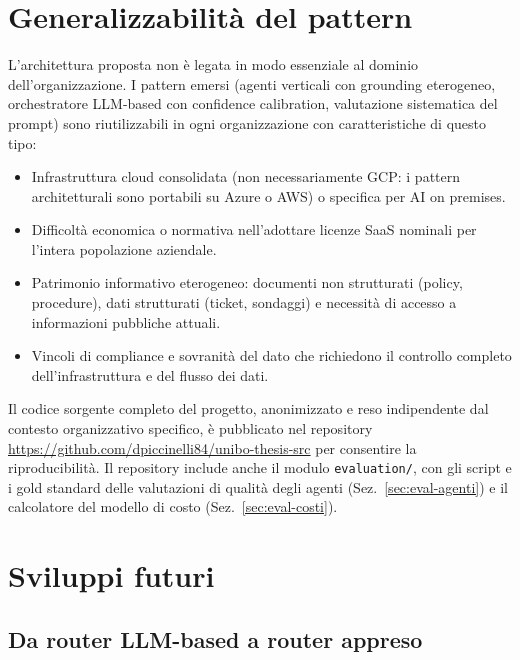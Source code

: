 \section{Generalizzabilità del pattern}
\label{sec:concl-generalizzabilita}

L'architettura proposta non è legata in modo essenziale al dominio dell'organizzazione. I pattern emersi (agenti verticali con grounding eterogeneo, orchestratore LLM-based con confidence calibration, 
valutazione sistematica del prompt) sono riutilizzabili in ogni organizzazione con caratteristiche di questo tipo:

\begin{itemize}
  \item Infrastruttura cloud consolidata (non necessariamente GCP: i pattern architetturali sono portabili su Azure o AWS) o specifica per AI on premises.
  \item Difficoltà economica o normativa nell'adottare licenze SaaS nominali per l'intera popolazione aziendale.
  \item Patrimonio informativo eterogeneo: documenti non strutturati (policy, procedure), dati strutturati (ticket, sondaggi) e necessità di accesso a informazioni pubbliche attuali.
  \item Vincoli di compliance e sovranità del dato che richiedono il controllo completo dell'infrastruttura e del flusso dei dati.
\end{itemize}

Il codice sorgente completo del progetto, anonimizzato e reso indipendente dal contesto organizzativo specifico,
è pubblicato nel repository \url{https://github.com/dpiccinelli84/unibo-thesis-src} per consentire la riproducibilità. 
Il repository include anche il modulo \texttt{evaluation/}, con gli script e i gold standard delle valutazioni di qualità degli agenti (Sez.~\ref{sec:eval-agenti}) 
e il calcolatore del modello di costo (Sez.~\ref{sec:eval-costi}).

\section{Sviluppi futuri}
\label{sec:concl-futuri}

\subsection{Da router LLM-based a router appreso}
\label{subsec:concl-routellm}

